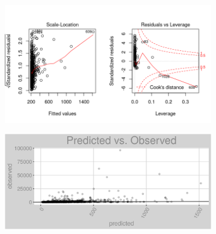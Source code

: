 \begin{figure}[h]
\centering
\begin{subfigure}{1\textwidth}
\centering
\includegraphics[width=.99\textwidth, height=0.475\textheight]{Images/fuel_oil_lp_res_2.png}
\end{subfigure}
\begin{subfigure}{1\textwidth}
\centering
\includegraphics[width=.99\textwidth, height=0.3\textheight]{Images/fuel_oil_lp_pvo.png}
\end{subfigure}
\end{figure}
\FloatBarrier
\newpage
